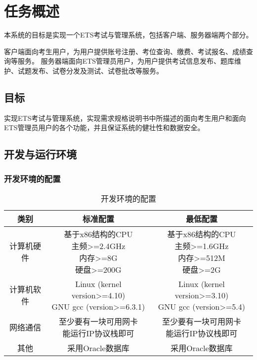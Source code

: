 \chapter{任务概述}
本系统的目标是实现一个ETS考试与管理系统，包括客户端、服务器端两个部分。

客户端面向考生用户，为用户提供账号注册、考位查询、缴费、考试报名、成绩查询等服务。
服务器端面向ETS管理员用户，为用户提供考试信息发布、题库维护、试题发布、试卷分发及测试、试卷批改等服务。

\section{目标}
实现ETS考试与管理系统，实现需求规格说明书中所描述的面向考生用户和面向ETS管理员用户的各个功能，并且保证系统的健壮性和数据安全。

\section{开发与运行环境}

\subsection{开发环境的配置}
\begin{table}[htbp]
\centering
\caption{开发环境的配置} \label{tab:development-environment}
\begin{tabular}{|c|c|c|}
    \hline
    类别 & 标准配置 & 最低配置 \\
    \hline
    计算机硬件 & \tabincell{c}{基于x86结构的CPU\\ 主频>=2.4GHz\\ 内存>=8G\\ 硬盘>=200G} & \tabincell{c}{基于x86结构的CPU\\ 主频>=1.6GHz\\ 内存>=512M\\ 硬盘>=2G} \\
    \hline
    计算机软件 & \tabincell{c}{Linux (kernel version>=4.10)\\ GNU gcc (version>=6.3.1)} & \tabincell{c}{Linux (kernel version>=3.10)\\ GNU gcc (version>=5.4)} \\
    \hline
    网络通信 & \tabincell{c}{至少要有一块可用网卡\\ 能运行IP协议栈即可} & \tabincell{c}{至少要有一块可用网卡\\ 能运行IP协议栈即可} \\
    \hline
    其他 & 采用Oracle数据库 & 采用Oracle数据库 \\
    \hline
\end{tabular}
\end{table}

